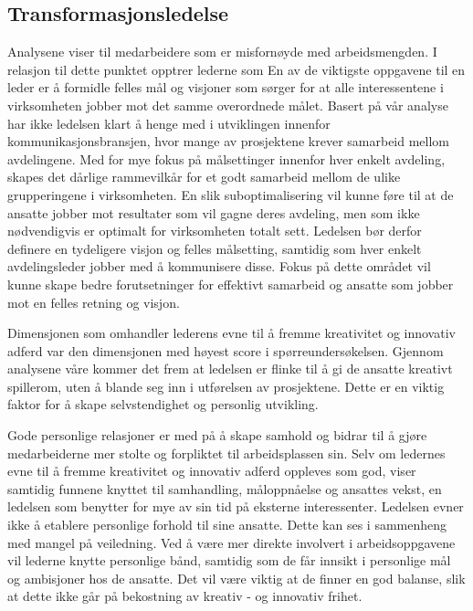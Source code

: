 \subsection{Transformasjonsledelse}
Analysene viser til medarbeidere som er misfornøyde med arbeidsmengden. I relasjon til dette punktet opptrer lederne som En av de viktigste oppgavene til en leder er å formidle felles mål og visjoner som sørger for at alle interessentene i virksomheten jobber mot det samme overordnede målet. Basert på vår analyse har ikke ledelsen klart å henge med i utviklingen innenfor kommunikasjonsbransjen, hvor mange av prosjektene krever samarbeid mellom avdelingene. Med for mye fokus på målsettinger innenfor hver enkelt avdeling, skapes det dårlige rammevilkår for et godt samarbeid mellom de ulike grupperingene i virksomheten. En slik suboptimalisering vil kunne føre til at de ansatte jobber mot resultater som vil gagne deres avdeling, men som ikke nødvendigvis er optimalt for virksomheten totalt sett. Ledelsen bør derfor definere en tydeligere visjon og felles målsetting, samtidig som hver enkelt avdelingsleder jobber med å kommunisere disse. Fokus på dette området vil kunne skape bedre forutsetninger for effektivt samarbeid og ansatte som jobber mot en felles retning og visjon.

\indent \newline
Dimensjonen som omhandler lederens evne til å fremme kreativitet og innovativ adferd var den dimensjonen med høyest score i spørreundersøkelsen. Gjennom analysene våre kommer det frem at ledelsen er flinke til å gi de ansatte kreativt spillerom, uten å blande seg inn i utførelsen av prosjektene. Dette er en viktig faktor for å skape selvstendighet og personlig utvikling. 

\indent \newline
Gode personlige relasjoner er med på å skape samhold og bidrar til å gjøre medarbeiderne mer stolte og forpliktet til arbeidsplassen sin. Selv om ledernes evne til å fremme kreativitet og innovativ adferd oppleves som god, viser samtidig funnene knyttet til samhandling, måloppnåelse og ansattes vekst, en ledelsen som benytter for mye av sin tid på eksterne interessenter. Ledelsen evner ikke å etablere personlige forhold til sine ansatte. Dette kan ses i sammenheng med mangel på veiledning. Ved å være mer direkte involvert i arbeidsoppgavene vil lederne knytte personlige bånd, samtidig som de får innsikt i personlige mål og ambisjoner hos de ansatte. Det vil være viktig at de finner en god balanse, slik at dette ikke går på bekostning av kreativ - og innovativ frihet.

